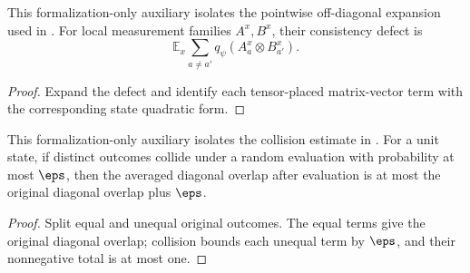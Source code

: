 \begin{lemma}
	\label{lem:sandwich-placed-defect-expansion}
	\leanok
	This formalization-only auxiliary isolates the pointwise off-diagonal
	expansion used in \cite[Fact~4.34]{Natarajan2018NEEXP}. For local measurement families
	$A^x,B^x$, their consistency defect is
	\[
		\mathbb E_x\sum_{a\ne a'}q_\psi(A^x_a\otimes B^x_{a'}).
	\]
\end{lemma}
\begin{proof}
	\leanok
	Expand the defect and identify each tensor-placed matrix-vector term with
	the corresponding state quadratic form.
\end{proof}

\begin{lemma}
	\label{lem:sandwich-evaluated-diagonal-overlap}
	\leanok
	This formalization-only auxiliary isolates the collision estimate in
	\cite[Fact~4.34]{Natarajan2018NEEXP}. For a unit state, if distinct outcomes collide under
	a random evaluation with probability at most $\eps$, then the averaged
	diagonal overlap after evaluation is at most the original diagonal overlap
	plus $\eps$.
\end{lemma}
\begin{proof}
	\leanok
	Split equal and unequal original outcomes. The equal terms give the original
	diagonal overlap; collision bounds each unequal term by $\eps$, and their
	nonnegative total is at most one.
\end{proof}

